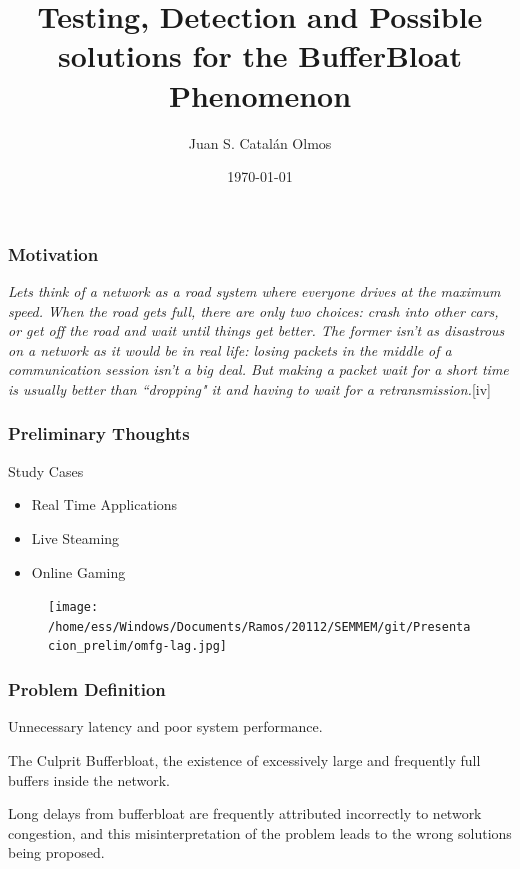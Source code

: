 \documentclass{beamer}
\title[The BufferBloar Phenomenon]{Testing, Detection and Possible solutions for the BufferBloat Phenomenon}
\author{Juan S. Catal\'an Olmos}
\institute[UTFSM]
{
Universidad T\'ecnica Federico Santa Mar\'ia\\
\medskip
{\emph{Computer Science Department}}
}
\date{\today}
\begin{document}
%
\begin{frame}
\titlepage
\end{frame}
%
\begin{frame}
\frametitle{Motivation}
\begin{block}{}
\textit{Lets think of a network as a road system where everyone drives at the maximum speed. When the road gets full, there are only two choices: crash into other cars, or get off the road and wait until things get better. The former isn't as disastrous on a network as it would be in real life: losing packets in the middle of a communication session isn't a big deal. But making a packet wait for a short time is usually better than ``dropping" it and having to wait for a retransmission.}[iv]
\end{block}
\end{frame}
%
\begin{frame}
\frametitle{Preliminary Thoughts}
\begin{block}{Study Cases}
\begin{center}
\begin{itemize}
\item Real Time Applications
\item Live Steaming
\item Online Gaming
\end{itemize}
\end{center}
\end{block}
\begin{figure}[htp]
\centering
\texttt{[image: /home/ess/Windows/Documents/Ramos/20112/SEMMEM/git/Presentacion\_prelim/omfg-lag.jpg]}
\label{lag}
\end{figure}
\end{frame}
%
\begin{frame}
\frametitle{Problem Definition}
\begin{block}{}
Unnecessary latency and poor system performance.
\end{block}
\begin{block}{The Culprit}
Bufferbloat, the existence of excessively large and frequently full buffers inside the network.
\end{block}
\begin{block}{}
 Long delays from bufferbloat are frequently attributed incorrectly to network congestion, and this misinterpretation of the problem leads to the wrong solutions being proposed.
\end{block}
\end{frame}
%
\end{document}
